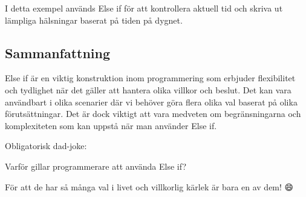 \hypertarget{cb4}{}
\begin{Shaded}
\begin{Highlighting}[]
 \OperatorTok{;}

\OperatorTok{=}\OperatorTok{();}
 \OperatorTok{(}\OperatorTok{()} \OperatorTok{\textless{}} \OperatorTok{)} \OperatorTok{\{}
    \OperatorTok{(}\OperatorTok{);}
\OperatorTok{\}}   \OperatorTok{(}\OperatorTok{()} \OperatorTok{\textless{}} \OperatorTok{)} \OperatorTok{\{}
    \OperatorTok{(}\OperatorTok{);}
\OperatorTok{\}}  \OperatorTok{\{}
    \OperatorTok{(}\OperatorTok{);}
\OperatorTok{\}}
\end{Highlighting}
\end{Shaded}

I detta exempel används Else if för att kontrollera aktuell tid och
skriva ut lämpliga hälsningar baserat på tiden på dygnet.

\hypertarget{sammanfattning}{%
\subsection{Sammanfattning}\label{sammanfattning}}

Else if är en viktig konstruktion inom programmering som erbjuder
flexibilitet och tydlighet när det gäller att hantera olika villkor och
beslut. Det kan vara användbart i olika scenarier där vi behöver göra
flera olika val baserat på olika förutsättningar. Det är dock viktigt
att vara medveten om begränsningarna och komplexiteten som kan uppstå
när man använder Else if.

Obligatorisk dad-joke:

Varför gillar programmerare att använda Else if?

För att de har så många val i livet och villkorlig kärlek är bara en av
dem! 😄

